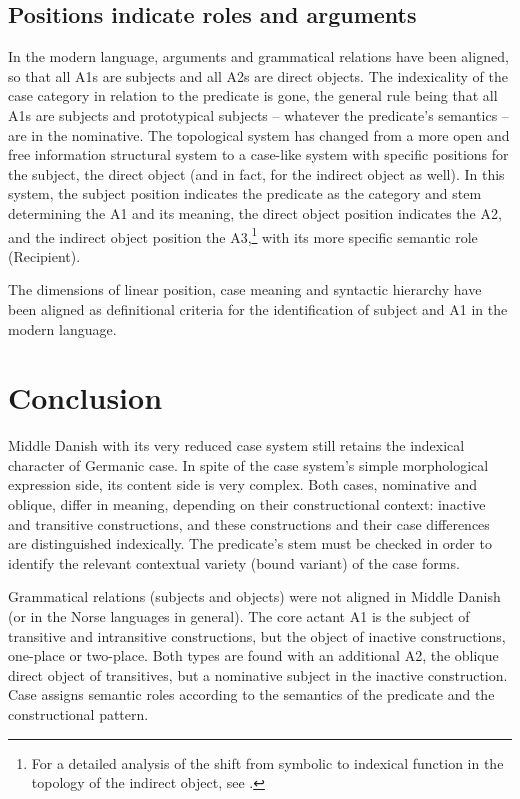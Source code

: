 \documentclass[output=paper]{langscibook}
\begin{document}
\subsection{Positions indicate roles and arguments} \label{heltoft:5.3}

In the modern language, arguments and grammatical relations have been aligned, so that all A1s are subjects and all A2s are direct objects. The indexicality of the case category in relation to the predicate is gone, the general rule being that all A1s are subjects and prototypical  subjects – whatever the predicate's semantics – are in the nominative. The topological system has changed from a more open and free information structural system to a case-like system with specific positions for the subject, the direct object (and in fact, for the indirect object as well). In this system, the subject position indicates the predicate as the category and stem determining the A1 and its meaning, the direct object position indicates the A2, and the indirect object position the A3,\footnote{For a detailed analysis of the shift from symbolic to indexical function in the topology of the indirect object, see \citet{NielsenHeltoft2020}.} with its more specific semantic role (Recipient). 

The dimensions of linear position, case meaning and syntactic hierarchy have been aligned as definitional criteria for the identification of subject and A1 in the modern language. 

\section{Conclusion} \label{heltoft:6}

Middle Danish with its very reduced case system still retains the indexical character of Germanic case. In spite of the case system's simple morphological expression side, its content side is very complex. Both cases, nominative and oblique, differ in meaning, depending on their constructional context: inactive and transitive constructions, and these constructions and their case differences are distinguished indexically. The predicate's stem must be checked in order to identify the relevant contextual variety (bound variant) of the case forms. 

Grammatical relations (subjects and objects) were not aligned in Middle Danish (or in the Norse languages in general). The core actant A1 is the subject of transitive and intransitive constructions, but the object of inactive constructions, one-place or two-place. Both types are found with an additional A2, the oblique direct object of transitives, but a nominative subject in the inactive construction. Case assigns semantic roles according to the semantics of the predicate and the constructional pattern.
\end{document}
